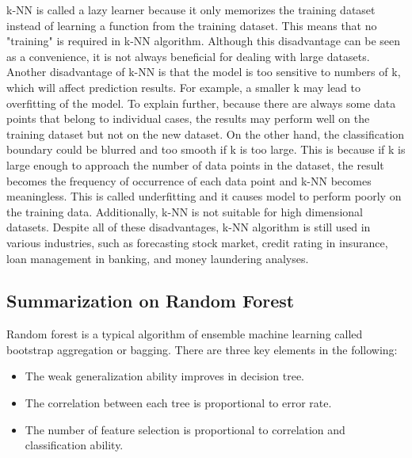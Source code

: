 \documentclass[12pt]{article} %
\theoremstyle{definition}
\begin{document}
\vspace{\baselineskip}
k-NN is called a lazy learner because it only memorizes the training dataset instead of learning a function from the training dataset. This means that no "training" is required in k-NN algorithm. Although this disadvantage can be seen as a convenience, it is not always beneficial for dealing with large datasets. Another disadvantage of k-NN is that the model is too sensitive to numbers of k\cite{KNN1}, which will affect prediction results. For example, a smaller k may lead to overfitting of the model. To explain further, because there are always some data points that belong to individual cases, the results may perform well on the training dataset but not on the new dataset. On the other hand, the classification boundary could be blurred and too smooth if k is too large. This is because if k is large enough to approach the number of data points in the dataset, the result becomes the frequency of occurrence of each data point and k-NN becomes meaningless. This is called underfitting and it causes model to perform poorly on the training data. Additionally, k-NN is not suitable for high dimensional datasets. Despite all of these disadvantages, k-NN algorithm is still used in various industries, such as forecasting stock market, credit rating in insurance, loan management in banking, and money laundering analyses\cite{KNN2}.

\subsection{Summarization on Random Forest}
Random forest is a typical algorithm of ensemble machine learning called bootstrap aggregation or bagging. There are three key elements in the following:

\begin{itemize}
    \item The weak generalization ability improves in decision tree.
\end{itemize}

\begin{itemize}
    \item The correlation between each tree is proportional to error rate.
\end{itemize}

\begin{itemize}
    \item The number of feature selection is proportional to correlation and classification ability.
\end{itemize}
\end{document}
